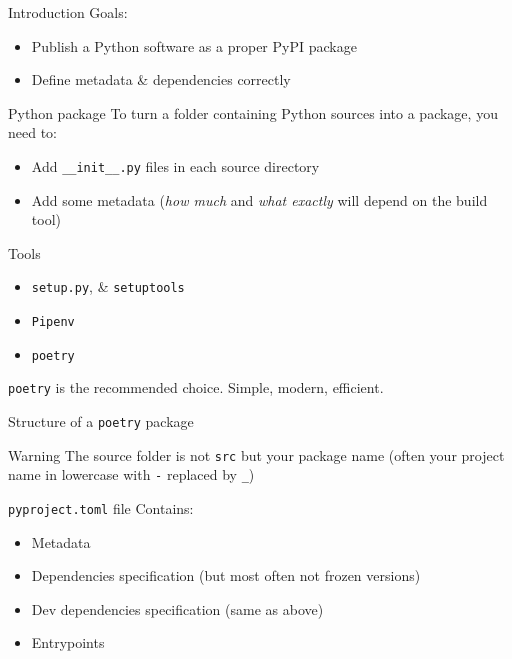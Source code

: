 \begin{frame}{Introduction}
  Goals:
  \begin{itemize}
    \item Publish a Python software as a proper PyPI package
    \item Define metadata \& dependencies correctly
  \end{itemize}
\end{frame}

\begin{frame}{Python package}
  To turn a folder containing Python sources into a package, you need to:

  \begin{itemize}
    \item Add \texttt{\_\_init\_\_.py} files in each source directory
    \item Add some metadata (\textit{how much} and \textit{what exactly} will depend on the build tool)
  \end{itemize}
\end{frame}

\begin{frame}{Tools}
  \begin{itemize}
    \item \texttt{setup.py}, \& \texttt{setuptools}
    \item \texttt{Pipenv}
    \item \texttt{poetry}
  \end{itemize}

  \texttt{poetry} is the recommended choice. Simple, modern, efficient.
\end{frame}

\begin{frame}{Structure of a \texttt{poetry} package}
  \begin{alertblock}{Warning}
    The source folder is not \texttt{src} but your package name (often your project name in lowercase with \texttt{-} replaced by \texttt{\_})
  \end{alertblock}
\end{frame}

\begin{frame}{\texttt{pyproject.toml} file}
  Contains:

  \begin{itemize}
    \item Metadata
    \item Dependencies specification (but most often not frozen versions)
    \item Dev dependencies specification (same as above)
    \item Entrypoints
  \end{itemize}
\end{frame}

